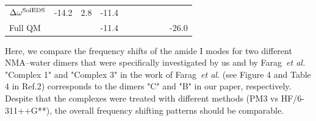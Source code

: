 \documentclass[a4paper,titlepage,twoside,fleqn,12pt]{book}
\begin{document}
\begin{refsection}
\begin{table}[t!]
\begin{tabular*}{1.0\textwidth}{@{\extracolsep{\fill} } lccccccccc}
 $\Delta\omega^{\rm SolEDS}$    
          & -14.2 &  2.8  & -11.4 && & & & &       \\
 Full QM  &       &       & -11.4 && & & & & -26.0 \\
%
\hline\hline
\end{tabular*}
\end{table}
%
Here, we compare the frequency shifts of the amide I modes for two different 
NMA--water dimers that were specifically investigated by us and by Farag~\emph{et al.} 
"Complex 1" and "Complex 3" in the work of Farag~\emph{et al.} 
(see Figure 4 and Table 4 in Ref.2) corresponds to the dimers "C" and "B" 
in our paper, respectively. Despite that the complexes were treated 
with different methods (PM3 vs HF/6-311++G**), the overall frequency shifting 
patterns should be comparable. 


\end{refsection}
\end{document}
